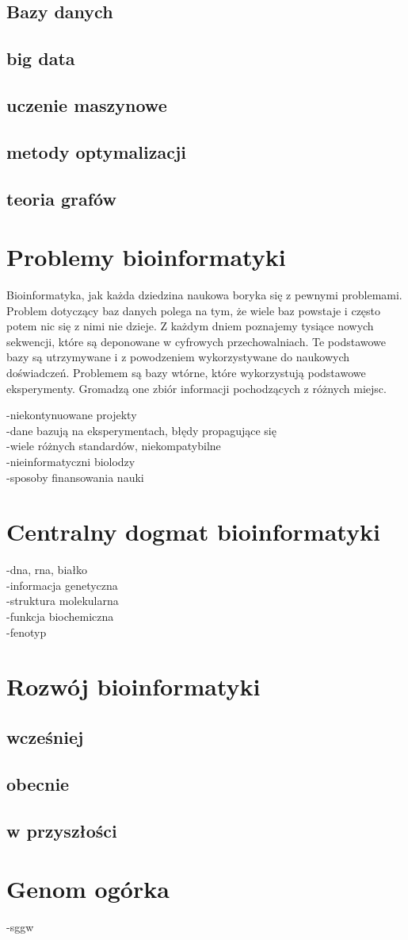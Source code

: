 \subsection{Bazy danych}
\subsection{big data}
\subsection{uczenie maszynowe}
\subsection{metody optymalizacji}
\subsection{teoria grafów}

\section{Problemy bioinformatyki}
Bioinformatyka, jak każda dziedzina naukowa boryka się z pewnymi problemami. Problem dotyczący baz danych polega na tym, że wiele baz powstaje i często potem nic się z nimi nie dzieje. Z każdym dniem poznajemy tysiące nowych sekwencji, które są deponowane w cyfrowych przechowalniach. Te podstawowe bazy są utrzymywane i z powodzeniem wykorzystywane do naukowych doświadczeń. Problemem są bazy wtórne, które wykorzystują podstawowe eksperymenty. Gromadzą one zbiór informacji pochodzących z różnych miejsc.

-niekontynuowane projekty \\
-dane bazują na eksperymentach, błędy propagujące się \\
-wiele różnych standardów, niekompatybilne \\
-nieinformatyczni biolodzy \\
-sposoby finansowania nauki \\

\section{Centralny dogmat bioinformatyki}
-dna, rna, białko \\
-informacja genetyczna \\
-struktura molekularna \\
-funkcja biochemiczna \\
-fenotyp

\section{Rozwój bioinformatyki}
\subsection{wcześniej}
\subsection{obecnie}
\subsection{w przyszłości}

\section{Genom ogórka}
-sggw
